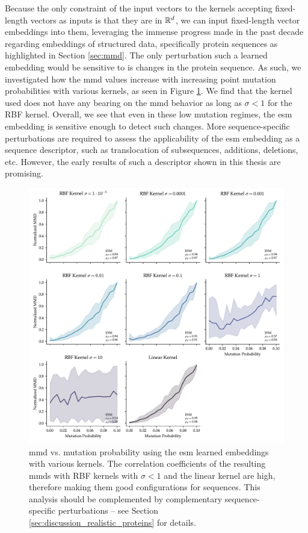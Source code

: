 Because the only constraint of the input vectors to the kernels accepting
fixed-length vectors as inputs is that they are in $\mathbb{R}^d$, we can input
fixed-length vector embeddings into them, leveraging the immense progress made
in the past decade regarding embeddings of structured data, specifically protein
sequences as highlighted in Section \ref{sec:mmd}. The only perturbation such a
learned embedding would be sensitive to is changes in the protein sequence. As
such, we investigated how the \acrshort{mmd} values increase with increasing point mutation
probabilities with various kernels, as seen in Figure \ref{fig:esm_descriptor}.
We find that the kernel used does not have any bearing on the \acrshort{mmd} behavior as
long as $\sigma<1$ for the RBF kernel. Overall, we see that even in these low
mutation regimes, the \acrshort{esm} embedding is sensitive enough to detect such changes.
More sequence-specific perturbations are required to assess the
applicability of the \acrshort{esm} embedding as a sequence descriptor, such as
translocation of subsequences, additions, deletions, etc. However, the early
results of such a descriptor shown in this thesis are promising.

\begin{figure}
  \centering
  \includegraphics[width=\textwidth]{./figures/results/res_5.pdf}
  \caption[\acrshort{mmd} using \acrshort{esm} embeddings.]{\acrshort{mmd} vs. mutation probability using the \acrshort{esm}
learned embeddings with various kernels. The correlation coefficients of the
resulting \acrshort{mmd}s with RBF kernels with $\sigma<1$ and the linear kernel are high,
therefore making them good configurations for sequences. This analysis should be
complemented by complementary sequence-specific perturbations -- see Section
\ref{sec:discussion_realistic_proteins} for details.}
  \label{fig:esm_descriptor}
\end{figure}


